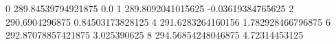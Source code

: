 0 289.84539794921875 0.0
1 289.8092041015625 -0.03619384765625
2 290.6904296875 0.84503173828125
4 291.6283264160156 1.782928466796875
6 292.87078857421875 3.025390625
8 294.56854248046875 4.72314453125
